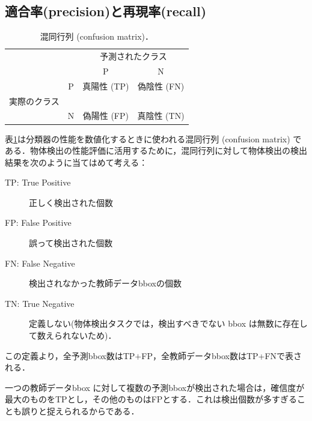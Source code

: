 \documentclass[twocolumn]{jsarticle} %
\begin{document}
\subsection{適合率(precision)と再現率(recall)}
\begin{table}
    \caption{ 混同行列 (confusion matrix)．}
    \label{tbl-confuse}
    \centering
    \begin{tabular}{cc|c|c|} 
        \multicolumn{2}{c}{} & \multicolumn{2}{c}{予測されたクラス} \\ 
        \multicolumn{2}{l}{} & \multicolumn{1}{c}{P} & \multicolumn{1}{c}{N} \\ \cline{3-4}
        \vspace*{-3mm}
         & P & 真陽性 (TP) & 偽陰性 (FN) \\ 
        \vspace*{-2mm}
        実際のクラス\!\!\!\!\!\! &  &  &  \\ \cline{3-4}
         & N  & 偽陽性 (FP) &  真陰性 (TN) \\  \cline{3-4}
    \end{tabular}
\end{table}
表\ref{tbl-confuse}は分類器の性能を数値化するときに使われる混同行列 (confusion matrix) である．物体検出の性能評価に活用するために，混同行列に対して物体検出の検出結果を次のように当てはめて考える：
\\
\begin{description}
    \item[TP: True Positive] 正しく検出された個数
    \item[FP: False Positive] 誤って検出された個数
    \item[FN: False Negative] 検出されなかった教師データbboxの個数
    \item[TN: True Negative] 定義しない(物体検出タスクでは，検出すべきでない bbox は無数に存在して数えられないため)．
\end{description}\vspace{4mm}
この定義より，全予測bbox数はTP${+}$FP，全教師データbbox数はTP{+}FNで表される．

一つの教師データbbox に対して複数の予測bboxが検出された場合は，確信度が最大のものをTPとし，その他のものはFPとする．これは検出個数が多すぎることも誤りと捉えられるからである．
\end{document}

